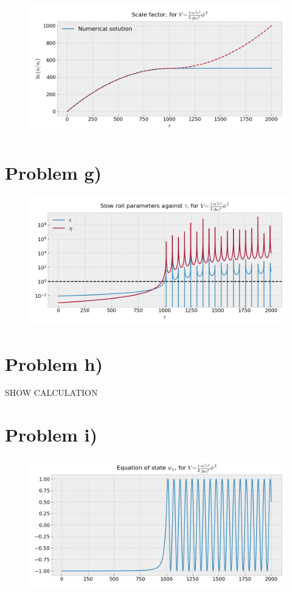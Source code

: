 \documentclass[reprint,english,notitlepage]{revtex4-1}  %
\numberwithin{equation}{section}
\begin{document}
\begin{figure}[h!]
	\includegraphics[width=\linewidth]{QuadraticPotential_scale-factor.png}
	\caption{}
	\label{fig:quad_a}
\end{figure}

\section{Problem g)}
\begin{figure}[h!]
	\includegraphics[width=\linewidth]{QuadraticPotential_slowroll-tau.png}
	\caption{}
	\label{}
\end{figure}

\section{Problem h)}
SHOW CALCULATION

\section{Problem i)}
\begin{figure}[h!]
	\includegraphics[width=\linewidth]{QuadraticPotential_field-eos.png}
	\caption{}
	\label{}
\end{figure}
\end{document}
